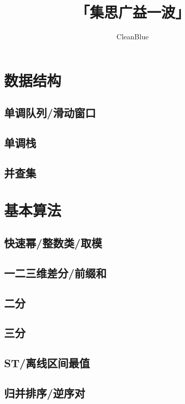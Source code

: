 \documentclass[twocolumn,a4]{article}
\title{\CJKfamily{hei} \bfseries 「集思广益一波」}
\author{CleanBlue}
\newcommand{\addcpp}[1]{}
\begin{document}
 \small
\begin{titlepage}
\maketitle
\end{titlepage}

\newpage
\pagestyle{empty}
\renewcommand{\contentsname}{目录}
\tableofcontents
\newpage\clearpage
\newpage
\pagestyle{fancy}
\setcounter{page}{1}   %

\section{数据结构}
	\subsection{单调队列/滑动窗口}
		\addcpp{ds/SlidingWindow.tex}
	\subsection{单调栈}
		\addcpp{ds/mono-stack.tex}
	\subsection{并查集}
		\addcpp{ds/dsu.tex}
\section{基本算法}
	\subsection{快速幂/整数类/取模}
		\addcpp{basic/Z.tex}
	\subsection{一二三维差分/前缀和}
		\addcpp{basic/difference.tex}
	\subsection{二分}
		\addcpp{basic/binary_search.tex}
	\subsection{三分}
		\addcpp{basic/ternary_search.tex}
	\subsection{ST/离线区间最值}
		\addcpp{basic/sparse_table.tex }
	\subsection{归并排序/逆序对}
		\addcpp{basic/merge_sort.tex}
	
\end{document}
